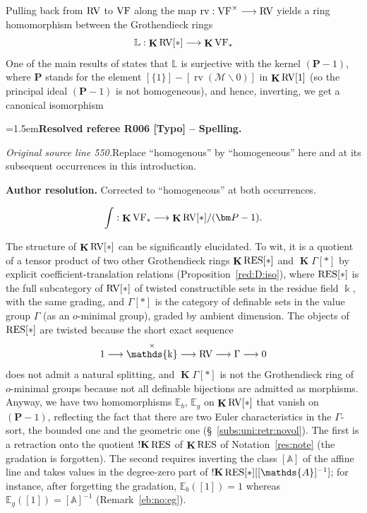\documentclass[12pt]{amsart}
\newcommand{\ResolvedRefereeRemark}[5]{%
  \par\medskip\begingroup\normalfont\small\color{gray}%
  \emergencystretch=1.5em\noindent\textbf{Resolved referee R#1 [#2] -- #3.}\par\nobreak\noindent #4\par
  \medskip\color{ResolutionGreen}\noindent\textbf{Author resolution.} #5\par
  \endgroup\medskip
}
\theoremstyle{plain}
\theoremstyle{definition}
\theoremstyle{remark}
\numberwithin{equation}{section}
\theoremstyle{plain}
\newcommand{\VF}{\textup{VF}}
\newcommand{\RV}{\textup{RV}}
\newcommand{\MM}{\mdl M}
\DeclareMathOperator{\K}{\mathds{k}}
\newcommand{\A}{\mathds{A}}
\newcommand{\omin}{$o$\nobreakdash}
\newcommand{\0}{\emptyset}
\newcommand{\mdl}[1]{\mathcal{#1}}  %
\newcommand{\bb}[1]{\mathbb{#1}}
\newcommand{\fun}{\longrightarrow}
\newcommand{\mi}{\smallsetminus}
\newcommand{\RES}{\textup{RES}}
\DeclareMathOperator{\rv}{rv}
\DeclareMathOperator{\ggk}{\mathbf{K}}
\DeclareMathOperator{\sggk}{!\mathbf{K}}
\begin{document}
Pulling back from $\RV$ to $\VF$ along the map $\rv: \VF^\times \fun \RV$ yields a ring homomorphism between the   Grothendieck rings
\begin{equation}\label{lifting:hom}
\bb L : \ggk\RV[*] \fun \ggk\VF_*
\end{equation}
One of the  main results of \cite{hrushovski:kazhdan:integration:vf} states that $\bb L$ is surjective with the kernel $(\bm P-1)$, where $\bm P$ stands for the element $[\{1\}] - [\rv(\MM \mi 0)]$  in $\ggk \RV[1]$ (so the principal ideal $(\bm P - 1)$ is not homogeneous), and hence, inverting, we get a canonical isomorphism

\ResolvedRefereeRemark{006}{Typo}{Spelling}{%
\textit{Original source line 550.}\quad Replace ``homogenous'' by ``homogeneous'' here and at its subsequent occurrences in this introduction.
}{Corrected to ``homogeneous'' at both occurrences.}
\[
\int : \ggk\VF_* \fun \ggk\RV[*]/(\bm P-1).
\]

The structure of $\ggk \RV[*]$ can be significantly elucidated. To wit, it is a quotient of a tensor product of two other Grothendieck rings $\ggk \RES[*]$ and $\ggk \Gamma[*]$ by explicit coefficient-translation relations (Proposition~\ref{red:D:iso}), where  $\RES[*]$ is the full subcategory of $\RV[*]$ of twisted constructible sets in the residue field $\K$, with the same grading, and $\Gamma[*]$ is the category of definable sets in the value group $\Gamma$ (as an \omin-minimal group), graded by ambient dimension. The objects of $\RES[*]$ are twisted because the short exact sequence
\[
1 \fun \K^\times \fun \RV \fun \Gamma \fun 0
\]
does not admit a natural splitting, and $\ggk \Gamma[*]$ is not the Grothendieck ring of \omin-minimal groups because not all definable bijections are admitted as morphisms. Anyway, we have two homomorphisms $\bb E_{b}$, $\bb E_{g}$ on $\ggk \RV[*]$ that vanish on $(\bm P-1)$, reflecting the fact that there are two Euler characteristics in the $\Gamma$-sort, the bounded one and the geometric one (\S~\ref{subs:uni:retr:novol}). The first is a retraction onto the quotient $\sggk \RES$ of $\ggk \RES$ of Notation~\ref{res:note} (the gradation is forgotten). The second requires inverting the class $[\A]$ of the affine line and takes values in the degree-zero part of $\sggk \RES[*][[\A]^{-1}]$; for instance, after forgetting the gradation, $\bb E_{b}([1]) = 1$ whereas $\bb E_{g}([1]) = [\A]^{-1}$ (Remark~\ref{eb:no:eg}).
\end{document}
